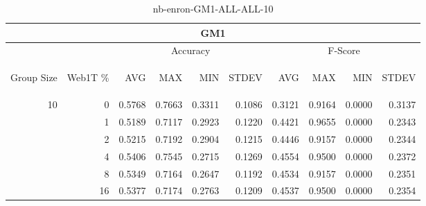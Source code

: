\begin{center}
\begin{table}[htbp]
\begin{tabular}{ | r | r | r | r | r | r | r | r | r | r |}
\hline
\multicolumn{10}{|c|}{GM1}\\
\hline
 & & \multicolumn{4}{|c|}{Accuracy} & \multicolumn{4}{|c|}{F-Score}\\ \cline{3-10}
\begin{sideways}Group Size\end{sideways} & \begin{sideways}Web1T \%\end{sideways} & \begin{sideways}AVG\end{sideways} & \begin{sideways}MAX\end{sideways} & \begin{sideways}MIN\end{sideways} & \begin{sideways}STDEV\end{sideways} & \begin{sideways}AVG\end{sideways} & \begin{sideways}MAX\end{sideways} & \begin{sideways}MIN\end{sideways} & \begin{sideways}STDEV\end{sideways}\\
\hline
\multirow{5}{*}{10}
 & 0 & 0.5768 & 0.7663 & 0.3311 & 0.1086 & 0.3121 & 0.9164 & 0.0000 & 0.3137\\ \cline{2-10}
 & 1 & 0.5189 & 0.7117 & 0.2923 & 0.1220 & 0.4421 & 0.9655 & 0.0000 & 0.2343\\ \cline{2-10}
 & 2 & 0.5215 & 0.7192 & 0.2904 & 0.1215 & 0.4446 & 0.9157 & 0.0000 & 0.2344\\ \cline{2-10}
 & 4 & 0.5406 & 0.7545 & 0.2715 & 0.1269 & 0.4554 & 0.9500 & 0.0000 & 0.2372\\ \cline{2-10}
 & 8 & 0.5349 & 0.7164 & 0.2647 & 0.1192 & 0.4534 & 0.9157 & 0.0000 & 0.2351\\ \cline{2-10}
 & 16 & 0.5377 & 0.7174 & 0.2763 & 0.1209 & 0.4537 & 0.9500 & 0.0000 & 0.2354\\ \cline{2-10}
\hline
\end{tabular}
\caption{nb-enron-GM1-ALL-ALL-10}
\label{table:nb-enron-GM1-ALL-ALL-10}
\end{table}
\end{center}

